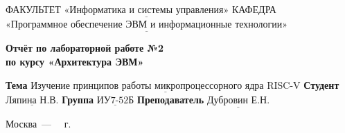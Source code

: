\begin{titlepage}
	
	\noindent ФАКУЛЬТЕТ $\underline{\text{«Информатика и системы управления»}}$ \newline\newline
	\noindent КАФЕДРА $\underline{\text{«Программное обеспечение ЭВМ и информационные технологии»}}$\newline\newline\newline\newline\newline\newline\newline
	
	\vspace{\baselineskip}

	\begin{center}
		\Large\textbf{Отчёт по лабораторной работе №2} \\
		\Large\textbf{по курсу «Архитектура ЭВМ»} \\
	\end{center}
	\vspace{2.5cm}
	
	\noindent\textbf{Тема} $\underline{\text{Изучение принципов работы микропроцессорного ядра RISC-V}}$\newline\newline
	\noindent\textbf{Студент} $\underline{\text{Ляпина Н.В.}}$\newline\newline
	\noindent\textbf{Группа} $\underline{\text{ИУ7-52Б}}$\newline\newline
	\noindent\textbf{Преподаватель} $\underline{\text{Дубровин Е.Н.}}$\newline
	
	\begin{center}
		\vfill
		Москва~---~\the\year
		~г.
	\end{center}
	\restoregeometry
\end{titlepage}